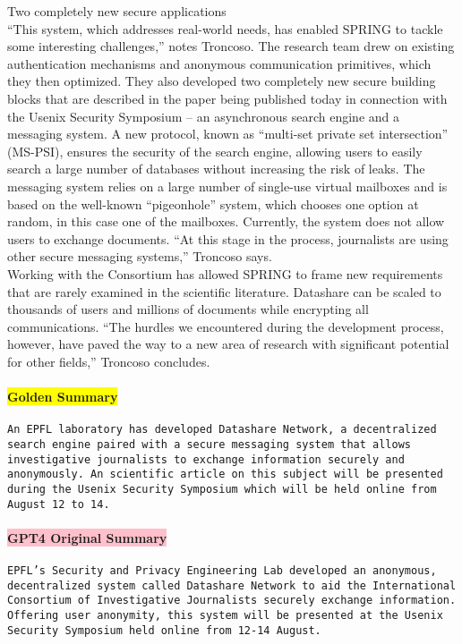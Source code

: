 {Two completely new secure applications \\
“This system, which addresses real-world needs, has enabled SPRING to tackle some interesting challenges,” notes Troncoso. The research team drew on existing authentication mechanisms and anonymous communication primitives, which they then optimized. They also developed two completely new secure building blocks that are described in the paper being published today in connection with the Usenix Security Symposium – an asynchronous search engine and a messaging system. A new protocol, known as “multi-set private set intersection” (MS-PSI), ensures the security of the search engine, allowing users to easily search a large number of databases without increasing the risk of leaks. The messaging system relies on a large number of single-use virtual mailboxes and is based on the well-known “pigeonhole” system, which chooses one option at random, in this case one of the mailboxes. Currently, the system does not allow users to exchange documents. “At this stage in the process, journalists are using other secure messaging systems,” Troncoso says. \\
Working with the Consortium has allowed SPRING to frame new requirements that are rarely examined in the scientific literature. Datashare can be scaled to thousands of users and millions of documents while encrypting all communications. “The hurdles we encountered during the development process, however, have paved the way to a new area of research with significant potential for other fields,” Troncoso concludes.}


\paragraph{\colorbox{yellow}{Golden Summary}}
\texttt{An EPFL laboratory has developed Datashare Network, a decentralized search engine paired with a secure messaging system that allows investigative journalists to exchange information securely and anonymously. An scientific article on this subject will be presented during the Usenix Security Symposium which will be held online from August 12 to 14.}


\paragraph{\colorbox{pink}{GPT4 Original Summary}}
\texttt{EPFL's Security and Privacy Engineering Lab developed an anonymous, decentralized system called Datashare Network to aid the International Consortium of Investigative Journalists securely exchange information. Offering user anonymity, this system will be presented at the Usenix Security Symposium held online from 12-14 August.}


